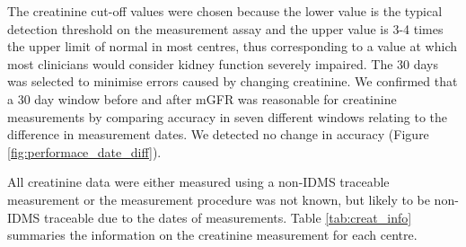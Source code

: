 \documentclass[11pt,]{article}
\begin{document}
The creatinine cut-off values were chosen because the lower value is the
typical detection threshold on the measurement assay and the upper value
is 3-4 times the upper limit of normal in most centres, thus
corresponding to a value at which most clinicians would consider kidney
function severely impaired. The 30 days was selected to minimise errors
caused by changing creatinine. We confirmed that a 30 day window before
and after mGFR was reasonable for creatinine measurements by comparing
accuracy in seven different windows relating to the difference in
measurement dates. We detected no change in accuracy (Figure
\ref{fig:performace_date_diff}).

All creatinine data were either measured using a non-IDMS traceable
measurement or the measurement procedure was not known, but likely to be
non-IDMS traceable due to the dates of measurements. Table
\ref{tab:creat_info} summaries the information on the creatinine
measurement for each centre.
\end{document}
